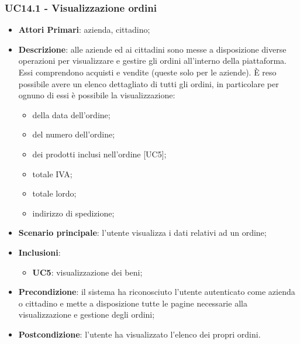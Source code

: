\subsubsection{UC14.1 - Visualizzazione ordini}
\begin{itemize}
	\item \textbf{Attori Primari}: azienda, cittadino;
	\item \textbf{Descrizione}: alle aziende ed ai cittadini sono messe a disposizione diverse operazioni per visualizzare e gestire gli ordini all'interno della piattaforma. Essi comprendono acquisti e vendite (queste solo per le aziende). \`E reso possibile avere un elenco dettagliato di tutti gli ordini, in particolare per ognuno di essi è possibile la visualizzazione:
	\begin{itemize}
		\item della data dell'ordine;
		\item del numero dell'ordine;
		\item dei prodotti inclusi nell'ordine [UC5];
		\item totale IVA;
		\item totale lordo\glo;
		\item indirizzo di spedizione;
	\end{itemize}
	\item \textbf{Scenario principale}: l'utente visualizza i dati relativi ad un ordine;
	\item \textbf{Inclusioni}:
	\begin{itemize}
		\item \textbf{UC5}: visualizzazione dei beni;
	\end{itemize}
	\item \textbf{Precondizione}: il sistema ha riconosciuto l'utente autenticato come azienda o cittadino e mette a disposizione tutte le pagine necessarie alla visualizzazione e gestione degli ordini;
	\item \textbf{Postcondizione}: l'utente ha visualizzato l'elenco dei propri ordini.
\end{itemize} 



